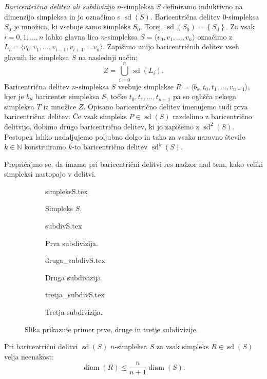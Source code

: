 \documentclass[mat1]{fmfdelo}
\newcommand{\N}{\mathbb N}
\DeclareMathOperator{\diam}{diam}
\DeclareMathOperator{\sd}{sd}
\newcommand{\0}{\underline{0}}
\begin{document}
\begin{definicija}
\emph{Baricentrično delitev ali subdivizijo} $n$-simpleksa $S$ definiramo induktivno na dimenzijo simpleksa in jo označimo s $\sd(S)$. Baricentrična delitev $0$-simpleksa $S_0$ je množica, ki vsebuje samo simpleks $S_0$. Torej, $\sd(S_0) = \left \{ S_0 \right \}$. Za vsak $i = 0, 1, \dots, n$ lahko glavna lica $n$-simpleksa $S = \langle v_0, v_1, \dots, v_n \rangle$ označimo z $L_i = \langle v_0, v_1, \dots, v_{i-1}, v_{i+1}, \dots v_n \rangle$. Zapišimo unijo baricentričnih delitev vseh glavnih lic simpleksa $S$ na naslednji način:
$$Z = \bigcup_{i = 0}^n \sd(L_i).$$
Baricentrična delitev $n$-simpleksa $S$ vsebuje simplekse $R = \langle b_s , t_0, t_1, \dots, v_{n-1} \rangle$, kjer je $b_S$ baricenter simpleksa $S$, točke $t_0, t_1, \dots, t_{n-1}$ pa so oglišča nekega simpleksa $T$ iz množice $Z$. Opisano baricentrično delitev imenujemo tudi prva baricentrična delitev. Če vsak simpleks $P \in \sd(S)$ razdelimo z baricentrično delitvijo, dobimo drugo baricentrično delitev, ki jo zapišemo z $\sd^2(S)$. Postopek lahko nadaljujemo poljubno dolgo in tako za vsako naravno število $k \in \N$ konstruiramo $k$-to baricentrično delitev $\sd^k(S)$.
\end{definicija}
Prepričajmo se, da imamo pri baricentrični delitvi res nadzor nad tem, kako veliki simpleksi nastopajo v delitvi.

\begin{figure}[h]  
\centering 
	\begin{subfigure}{0.4\linewidth} 
	\centering 
		{simpleksS.tex}%
		\caption{Simpleks $S$.}
	\end{subfigure}
	\vspace{0.5cm}
	\begin{subfigure}{0.4\linewidth} 
	\centering 
		{subdivS.tex}%
		\caption{Prva subdivizija.}
	\end{subfigure}
	\begin{subfigure}[b]{0.4\linewidth}
	\centering 
		{druga_subdivS.tex}%
		\caption{Druga subdivizija.} 
	\end{subfigure}
	\begin{subfigure}[b]{0.4\linewidth}
	\centering 
		{tretja_subdivS.tex}%
		\caption{Tretja subdivizija.}  
	\end{subfigure}
\caption{Slika prikazuje primer prve, druge in tretje subdivizije.}
\end{figure} 
\begin{trditev}\cite{hatcher}
Pri baricentrični delitvi $\sd(S)$ $n$-simpleksa $S$ za vsak simpleks $R \in \sd(S)$ velja neenakost: 
$$\diam(R) \leq \frac{n}{n+1} \diam(S).$$
\end{trditev}
\end{document}

